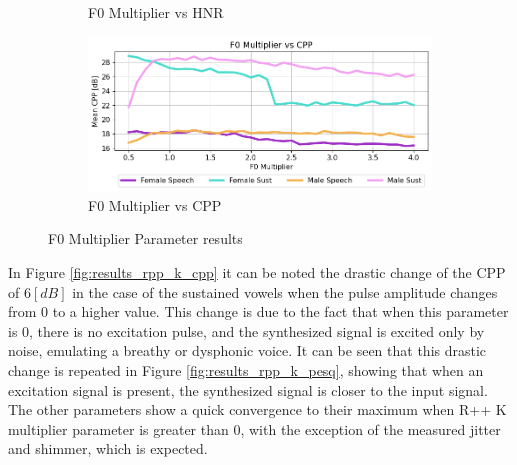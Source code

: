 \documentclass[final,5p,times,twocolumn]{elsarticle}
\begin{document}
\begin{figure}[!htpb]
\begin{subfigure}[b]{.49\textwidth}
		\caption{F0 Multiplier vs HNR}
        \label{fig:results_f0_multiplier_hnr}
	\end{subfigure}
	\begin{subfigure}[b]{.49\textwidth}
		\centering
		\includegraphics[width=.98\textwidth]{f0_multiplier_cpp.png}
		\caption{F0 Multiplier vs CPP}
        \label{fig:results_f0_multiplier_cpp}
	\end{subfigure}
	\caption{F0 Multiplier Parameter results}
\end{figure}

In Figure \ref{fig:results_rpp_k_cpp} it can be noted the drastic change of the CPP of $6 [dB]$ in the case of the sustained vowels when the pulse amplitude changes from 0 to a higher value. This change is due to the fact that when this parameter is 0, there is no excitation pulse, and the synthesized signal is excited only by noise, emulating a breathy or dysphonic voice. It can be seen that this drastic change is repeated in Figure \ref{fig:results_rpp_k_pesq}, showing that when an excitation signal is present, the synthesized signal is closer to the input signal. The other parameters show a quick convergence to their maximum when R++ K multiplier parameter is greater than 0, with the exception of the measured jitter and shimmer, which is expected.
\end{document}
